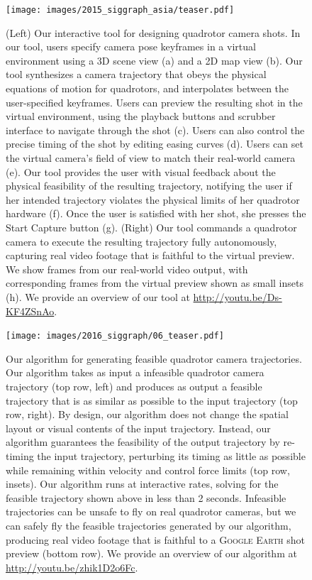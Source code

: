 \begin{figure}[t!]
\centering
\texttt{[image: images/2015\_siggraph\_asia/teaser.pdf]}
\caption{
(Left) Our interactive tool for designing quadrotor camera shots.
In our tool, users specify camera pose keyframes in a virtual environment using a 3D scene view (a) and a 2D map view (b).
Our tool synthesizes a camera trajectory that obeys the physical equations of motion for quadrotors, and interpolates between the user-specified keyframes.
Users can preview the resulting shot in the virtual environment, using the playback buttons and scrubber interface to navigate through the shot (c).
Users can also control the precise timing of the shot by editing easing curves (d).
Users can set the virtual camera's field of view to match their real-world camera (e).
Our tool provides the user with visual feedback about the physical feasibility of the resulting trajectory, notifying the user if her intended trajectory violates the physical limits of her quadrotor hardware (f).
Once the user is satisfied with her shot, she presses the Start Capture button (g).
(Right) Our tool commands a quadrotor camera to execute the resulting trajectory fully autonomously, capturing real video footage that is faithful to the virtual preview.
We show frames from our real-world video output, with corresponding frames from the virtual preview shown as small insets (h).
We provide an overview of our tool at \url{http://youtu.be/Ds-KF4ZSnAo}.
}
\label{fig:teaser}
\end{figure}

\begin{figure}[t!]
\centering
\texttt{[image: images/2016\_siggraph/06\_teaser.pdf]}
\caption{
Our algorithm for generating feasible quadrotor camera trajectories.
Our algorithm takes as input a infeasible quadrotor camera trajectory (top row, left) and produces as output a feasible trajectory that is as similar as possible to the input trajectory (top row, right).
By design, our algorithm does not change the spatial layout or  visual contents of the input trajectory.
Instead, our algorithm guarantees the feasibility of the output trajectory by re-timing the input trajectory, perturbing its timing as little as possible while remaining within velocity and control force limits (top row, insets).
Our algorithm runs at interactive rates, solving for the feasible trajectory shown above in less than 2 seconds.
Infeasible trajectories can be unsafe to fly on real quadrotor cameras, but we can safely fly the feasible trajectories generated by our algorithm, producing real video footage that is faithful to a \textsc{Google Earth} shot preview (bottom row).
We provide an overview of our algorithm at \url{http://youtu.be/zhik1D2o6Fc}.
}
\label{fig:teaser}
\end{figure}



